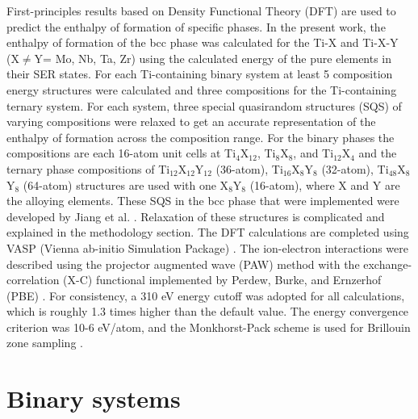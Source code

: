 First-principles results based on Density Functional Theory (DFT) are used to predict the enthalpy of formation of specific phases. In the present work, the enthalpy of formation of the bcc phase was calculated for the Ti-X and Ti-X-Y (X$\neq$Y= Mo, Nb, Ta, Zr) using the calculated energy of the pure elements in their SER states. For each Ti-containing binary system at least 5 composition energy structures were calculated and three compositions for the Ti-containing ternary system. For each system, three special quasirandom structures (SQS) of varying compositions were relaxed to get an accurate representation of the enthalpy of formation across the composition range. For the binary phases the compositions are each 16-atom unit cells at Ti$_4$X$_{12}$, Ti$_8$X$_8$, and Ti$_{12}$X$_4$ and the ternary phase compositions of Ti$_{12}$X$_{12}$Y$_{12}$ (36-atom), Ti$_{16}$X$_8$Y$_8$ (32-atom), Ti$_{48}$X$_8$Y$_8$ (64-atom) structures are used with one X$_8$Y$_8$ (16-atom), where X and Y are the alloying elements. These SQS in the bcc phase that were implemented were developed by Jiang et al. \cite{Jiang2004,Jiang2009}. Relaxation of these structures is complicated and explained in the methodology section. The DFT calculations are completed using VASP (Vienna ab-initio Simulation Package) \cite{Kresse1996}. The ion-electron interactions were described using the projector augmented wave (PAW) \cite{Kresse1999,Blochl1994} method with the exchange-correlation (X-C) functional implemented by Perdew, Burke, and Ernzerhof (PBE) \cite{Perdew1996a}. For consistency, a 310 eV energy cutoff was adopted for all calculations, which is roughly 1.3 times higher than the default value. The energy convergence criterion was 10-6 eV/atom, and the Monkhorst-Pack scheme is used for Brillouin zone sampling \cite{Kresse1996,Monkhorst1976a}. 

\section{Binary systems}

